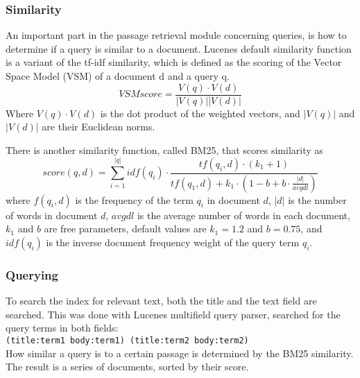 \subsubsection{Similarity}
An important part in the passage retrieval module concerning queries, is how to determine if a query is similar to a document.
Lucenes default similarity function is a variant of the tf-idf similarity, 
which is defined as the scoring of the Vector Space Model (VSM) of a document d and a query q.
\[VSM score = \frac{V(q)\cdot V(d)}{|V(q)||V(d)|} \]
Where $V(q) \cdot V(d)$ is the dot product of the weighted vectors, and $|V(q)|$ and $|V(d)|$ are their Euclidean norms. \cite{tfidfsimilarity}

There is another similarity function, called BM25, that scores similarity as
\[ score(q,d) = \sum_{i=1}^{|q|} idf(q_i) \cdot \frac{tf(q_i,d) \cdot (k_1 + 1)}{tf(q_1,d) + k_1 \cdot (1 - b + b \cdot \frac{|d|}{avgdl})} \]
where $f(q_i,d)$ is the frequency of the term $q_i$ in document $d$, 
$|d|$ is the number of words in document $d$,
$avgdl$ is the average number of words in each document,
$k_1$ and $b$ are free parameters, default values are $k_1 = 1.2$ and $b = 0.75$,
and $idf(q_i)$ is the inverse document frequency weight of the query term $q_i$. \cite{bm25similarity}

\subsubsection{Querying}
To search the index for relevant text, both the title and the text field are searched. 
This was done with Lucenes multifield query parser, searched for the query terms in both fields: \\
\texttt{(title:term1 body:term1) (title:term2 body:term2)} \\
How similar a query is to a certain passage is determined by the BM25 similarity.
The result is a series of documents, sorted by their score.
